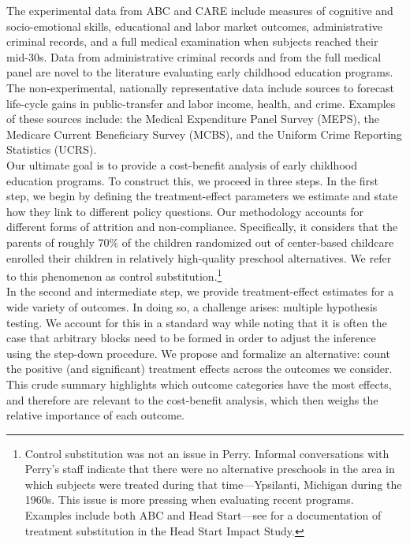 \noindent The experimental data from ABC and CARE include measures of cognitive and socio-emotional skills, educational and labor market outcomes, administrative criminal records, and a full medical examination when subjects reached their mid-30s. Data from administrative criminal records and from the full medical panel are novel to the literature evaluating early childhood education programs. The non-experimental, nationally representative data include sources to forecast life-cycle gains in public-transfer and labor income, health, and crime. Examples of these sources include: the Medical Expenditure Panel Survey (MEPS), the Medicare Current Beneficiary Survey (MCBS), and the Uniform Crime Reporting Statistics (UCRS).\\

\noindent Our ultimate goal is to provide a cost-benefit analysis of early childhood education programs. To construct this, we proceed in three steps. In the first step, we begin by defining the treatment-effect parameters we estimate and state how they link to different policy questions. Our methodology accounts for different forms of attrition and non-compliance. Specifically, it considers that the parents of roughly 70\% of the children randomized out of center-based childcare enrolled their children in relatively high-quality preschool alternatives. We refer to this phenomenon as control substitution.\footnote{Control  substitution was not an issue in Perry. Informal conversations with Perry's staff indicate that there were no alternative preschools in the area in which subjects were treated during that time---Ypsilanti, Michigan during the 1960s. This issue is more pressing when evaluating recent programs. Examples include both ABC and Head Start---see \citep{Puma_Bell_etal_2010_HeadStartImpact} for a documentation of treatment substitution in the Head Start Impact Study.}\\

\noindent In the second and intermediate step, we provide treatment-effect estimates for a wide variety of outcomes. In doing so, a challenge arises: multiple hypothesis testing. We account for this in a standard way \citep{Lehman_Romano_2005_AnnStat,Romano_Shaikh_2006_AnnStat} while noting that it is often the case that arbitrary blocks need to be formed in order to adjust the inference using the step-down procedure. We propose and formalize an alternative: count the positive (and significant) treatment effects across the outcomes we consider. This crude summary highlights which outcome categories have the most effects, and therefore are relevant to the cost-benefit analysis, which then weighs the relative importance of each outcome.\\ 

